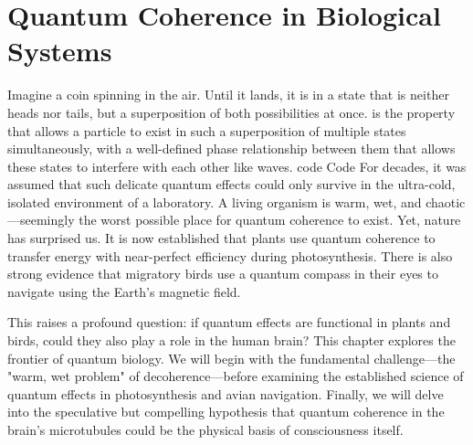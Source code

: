 \chapter{Quantum Coherence in Biological Systems}
\label{ch:quantum-coherence-in-biological-systems}
\begin{nontechnical}
Imagine a coin spinning in the air. Until it lands, it is in a state that is neither heads nor tails, but a superposition of both possibilities at once.  is the property that allows a particle to exist in such a superposition of multiple states simultaneously, with a well-defined phase relationship between them that allows these states to interfere with each other like waves.
code
Code
For decades, it was assumed that such delicate quantum effects could only survive in the ultra-cold, isolated environment of a laboratory. A living organism is warm, wet, and chaotic—seemingly the worst possible place for quantum coherence to exist. Yet, nature has surprised us. It is now established that plants use quantum coherence to transfer energy with near-perfect efficiency during photosynthesis. There is also strong evidence that migratory birds use a quantum compass in their eyes to navigate using the Earth's magnetic field.

This raises a profound question: if quantum effects are functional in plants and birds, could they also play a role in the human brain? This chapter explores the frontier of quantum biology. We will begin with the fundamental challenge—the "warm, wet problem" of decoherence—before examining the established science of quantum effects in photosynthesis and avian navigation. Finally, we will delve into the speculative but compelling hypothesis that quantum coherence in the brain's microtubules could be the physical basis of consciousness itself.
\end{nontechnical}
